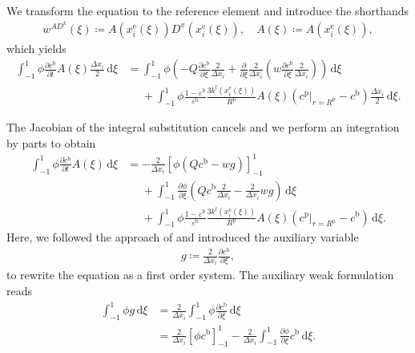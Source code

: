 We transform the equation to the reference element and introduce the shorthands
\begin{align*}
    w^{AD^\mathrm{x}}(\xi) \coloneq A(x_i^\mathrm e(\xi)) D^x(x_i^\mathrm e(\xi)),
    \quad
    A(\xi) \coloneq A(x_i^\mathrm e(\xi)),
\end{align*}
which yields
\begin{align*}
    \int_{-1}^1
    \phi
    \frac{\partial c^\mathrm{b}}{\partial t}
    A(\xi)
    \frac{\Delta x_i}{2}
    \,\mathrm d\xi
    &=
    \int_{-1}^1
    \phi
    \left(
    -
    Q
    \frac{\partial c^\mathrm{b}}{\partial\xi}
    \frac{2}{\Delta x_i}
    +
    \frac{\partial}{\partial\xi}
    \frac{2}{\Delta x_i}
    \left(
    w
    \frac{\partial c^\mathrm{b}}{\partial\xi}
    \frac{2}{\Delta x_i}
    \right)
    \right)
    \,\mathrm d\xi
    \\
    &\phantom{={}}
    +
    \int_{-1}^1
    \phi
    \frac{1-\varepsilon^\mathrm b}{\varepsilon^\mathrm b}
    \frac{3k^\mathrm f(x_i^\mathrm e(\xi))}{R^\mathrm p}
    A(\xi)
    \left(
    \left.c^\mathrm p\right|_{r=R^\mathrm p}
    -
    c^\mathrm{b}
    \right)
    \frac{\Delta x_i}{2}
    \,\mathrm d\xi.
\end{align*}

The Jacobian of the integral substitution cancels and we perform an integration by parts to obtain
\begin{align*}
    \int_{-1}^1 \phi \frac{\partial c^\mathrm{b}}{\partial t} A(\xi) \,\mathrm d\xi
    &=
    -
    \frac{2}{\Delta x_i}
    \left[
    \phi
    \left(
    Qc^\mathrm{b}
    -
    wg
    \right)
    \right]_{-1}^{1}
    \\
    &\phantom{={}}
    +
    \int_{-1}^1
    \frac{\partial\phi}{\partial\xi}
    \left(
    Q c^\mathrm{b}
    \frac{2}{\Delta x_i}
    -
    \frac{2}{\Delta x_i}
    wg
    \right)
    \,\mathrm d\xi
    \\
    &\phantom{={}}
    +
    \int_{-1}^1
    \phi
    \frac{1-\varepsilon^\mathrm b}{\varepsilon^\mathrm b}
    \frac{3k^\mathrm f(x_i^\mathrm e(\xi))}{R^\mathrm p}
    A(\xi)
    \left(
    \left.c^\mathrm p\right|_{r=R^\mathrm p}
    -
    c^\mathrm{b}
    \right)
    \,\mathrm d\xi.
\end{align*}
Here, we followed the approach of \cite{bassi_high-order_1997} and introduced the auxiliary variable
\begin{align}
   g \coloneq \frac{2}{\Delta x_i} \frac{\partial c^\mathrm{b}}{\partial\xi},
\end{align}
to rewrite the equation as a first order system.
The auxiliary weak formulation reads
\begin{align*}
    \int_{-1}^1
    \phi g
    \,\mathrm d\xi
    &=
    \frac{2}{\Delta x_i}
    \int_{-1}^1
    \phi
    \frac{\partial c^\mathrm{b}}{\partial\xi}
    \,\mathrm d\xi
    \\
    &=
    \frac{2}{\Delta x_i}
    \left[
    \phi c^\mathrm{b}
    \right]_{-1}^{1}
    -
    \frac{2}{\Delta x_i}
    \int_{-1}^1
    \frac{\partial\phi}{\partial\xi}
    c^\mathrm{b}
    \,\mathrm d\xi.
\end{align*}

